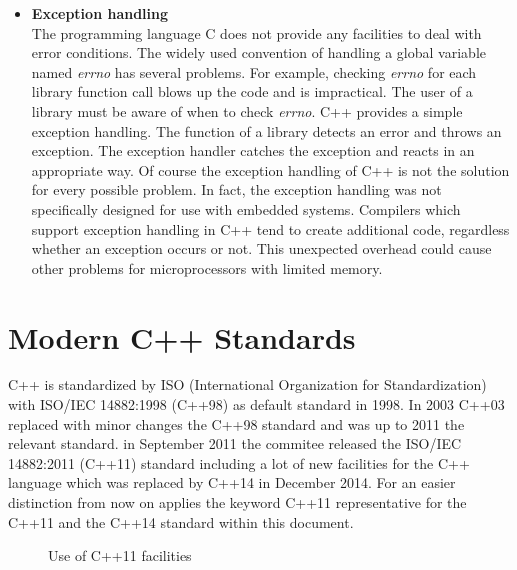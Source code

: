 {\begin{itemize}
\item\textbf{Exception handling}\\ The programming language C does not provide any facilities to deal with error conditions. The widely used convention of handling a global variable named \emph{errno} has several problems. For example, checking \emph{errno} for each library function call blows up the code and is impractical. The user of a library must be aware of when to check \emph{errno}. C++ provides a simple exception handling. The function of a library detects an error and throws an exception. The exception handler catches the exception and reacts in an appropriate way. Of course the exception handling of C++ is not the solution for every possible problem. In fact, the exception handling was not specifically designed for use with embedded systems. Compilers which support exception handling in C++ tend to create additional code, regardless whether an exception occurs or not. This unexpected overhead could cause other problems for microprocessors with limited memory. \cite[cf.][P. 200 - 206]{Walls2012}
\end{itemize}

\FloatBarrier 

\section{Modern C++ Standards}\label{sec:modernCplusplus}
C++ is standardized by ISO (International Organization for Standardization) with ISO/IEC 14882:1998 (C++98) as default standard in 1998. In 2003 C++03 replaced with minor changes the C++98 standard and was up to 2011 the relevant standard. in September 2011 the commitee released the ISO/IEC 14882:2011 (C++11) standard including a lot of new facilities for the C++ language which was replaced by C++14 in December 2014. \cite[cf.][]{Stroustrup2016_2} For an easier distinction from now on applies the keyword C++11 representative for the C++11 and the C++14 standard within this document.  

\begin{figure}[h]{}
\centering
\mbox{}
\caption{Use of C++11 facilities}
\label{fig:useOfCpp11}
\end{figure}

}
